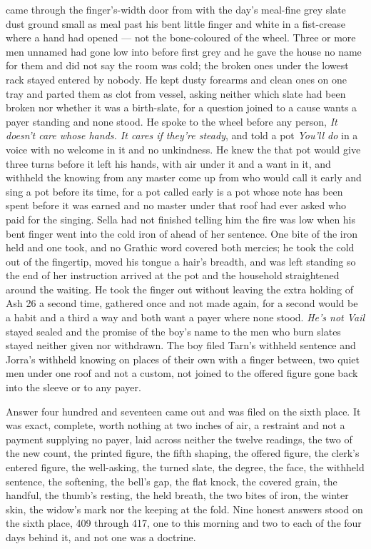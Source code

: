  came through the finger's-width door from  with the day's meal-fine grey slate dust ground small as meal past his bent little finger and white in a fist-crease where a hand had opened --- not the bone-coloured  of the wheel. Three or more men unnamed had gone low into  before first grey and he gave the house no name for them and did not say the room was cold; the broken ones under the lowest rack stayed entered by nobody. He kept dusty forearms and clean ones on one tray and parted them as clot from vessel, asking neither which slate had been broken nor whether it was a birth-slate, for a question joined to a cause wants a payer standing and none stood. He spoke to the wheel before any person, \emph{It doesn't care whose hands. It cares if they're steady}, and told a pot \emph{You'll do} in a voice with no welcome in it and no unkindness. He knew the  that pot would give three turns before it left his hands, with air under it and a want in it, and withheld the knowing from any master come up from  who would call it early and sing a pot before its time, for a pot called early is a pot whose note has been spent before it was earned and no master under that roof had ever asked who paid for the singing. Sella had not finished telling him the fire was low when his bent finger went into the cold iron of  ahead of her sentence. One bite of the iron held and one took, and no Grathic word covered both mercies; he took the cold out of the fingertip, moved his tongue a hair's breadth, and was left standing so the end of her instruction arrived at the pot and the household straightened around the waiting. He took the finger out without leaving the extra holding of Ash 26 a second time, gathered once and not made again, for a second would be a habit and a third a way and both want a payer where none stood. \emph{He's not Vail} stayed sealed and the promise of the boy's name to the men who burn slates stayed neither given nor withdrawn. The boy filed Tarn's withheld sentence and Jorra's withheld knowing on places of their own with a finger between, two quiet men under one roof and not a custom, not joined to the offered figure gone back into the sleeve or to any payer.

\scenebreak

Answer four hundred and seventeen came out and was filed on the sixth place. It was exact, complete, worth nothing at two inches of air, a restraint and not a payment supplying no payer, laid across neither the twelve readings, the two of the new count, the printed figure, the fifth shaping, the offered figure, the clerk's entered figure, the well-asking, the turned slate, the degree, the face, the withheld sentence, the softening, the bell's gap, the flat knock, the covered grain, the handful, the thumb's resting, the held breath, the two bites of iron, the winter skin, the widow's mark nor the keeping at the fold. Nine honest answers stood on the sixth place, 409 through 417, one to this morning and two to each of the four days behind it, and not one was a doctrine.

